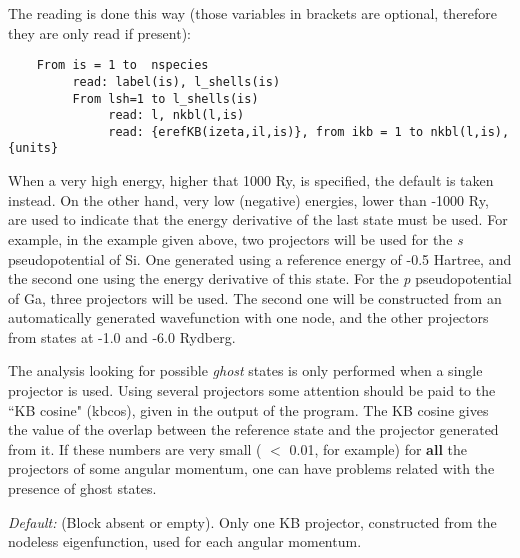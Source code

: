 \documentclass[11pt]{article}
\begin{document}
\begin{description}
The reading is done this way (those variables in brackets are optional,
therefore they are only read if
present):

\begin{verbatim}
    From is = 1 to  nspecies
         read: label(is), l_shells(is)
         From lsh=1 to l_shells(is)
              read: l, nkbl(l,is)
              read: {erefKB(izeta,il,is)}, from ikb = 1 to nkbl(l,is), {units}
\end{verbatim}

When a very high energy, higher that 1000 Ry, is specified, the
default is taken instead.  On the other hand, very low (negative)
energies, lower than -1000 Ry, are used to indicate that the energy
derivative of the last state must be used. For example, in the example
given above, two projectors will be used for the {\it s}
pseudopotential of Si. One generated using a reference energy of -0.5
Hartree, and the second one using the energy derivative of this
state. For the {\it p} pseudopotential of Ga, three projectors will be
used.  The second one will be constructed from an automatically
generated wavefunction with one node, and the other projectors from
states at -1.0 and -6.0 Rydberg.

The analysis looking for possible {\it ghost} states is only performed
when a single projector is used.  Using several projectors some
attention should be paid to the ``KB cosine" (kbcos), given in the
output of the program.  The KB cosine gives the value of the overlap
between the reference state and the projector generated from it.  If
these numbers are very small ( $<$ 0.01, for example) for {\bf all}
the projectors of some angular momentum, one can have problems related
with the presence of ghost states.

{\it Default:} (Block absent or empty). Only one KB projector,
constructed from the nodeless eigenfunction, used for each angular
momentum.
\noindent

\end{description}
\end{document}
